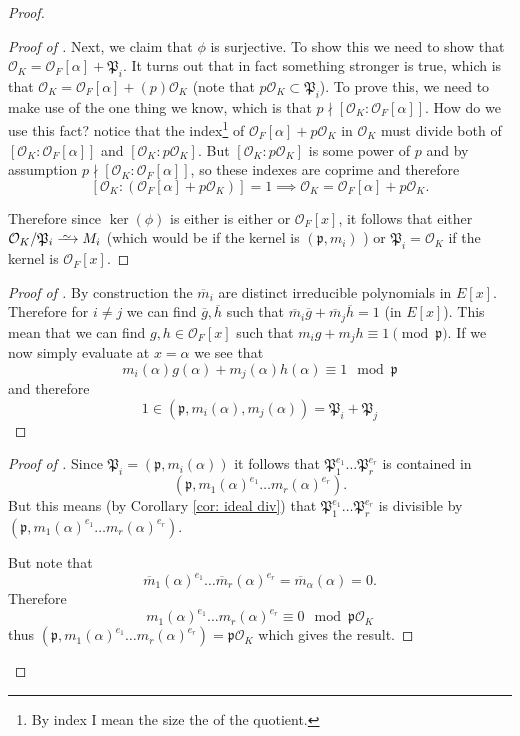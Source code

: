 \documentclass[11pt,a4paper]{report}
\theoremstyle{plain}
\theoremstyle{definition}
\theoremstyle{definition}
\def \gothP{\mathfrak{P}}
\def\gothp{\mathfrak{p}}
\def \a{\alpha}
\def \OO {\mathcal{O}}
\def \ov{\overline}
\newcommand\isorightarrow{\xrightarrow{
		\,\smash{\raisebox{-0.65ex}{\ensuremath{\scriptstyle\sim}}}\,}}
\begin{document}
\begin{proof}
\begin{proof}[Proof of \faGamepad]
			Next, we claim that $\phi$ is surjective. To show this we need to show that $\OO_K=\OO_F[\a]+\gothP_i$. It turns out that in fact something stronger is true, which is that $\OO_K=\OO_F[\a]+(p)\OO_K$ (note that $p\OO_K \subset \gothP_i$). To prove this, we need to make use of the one thing we know, which is that $p \nmid [\OO_K:\OO_F[\a]]$. How do we use this fact?  notice that the index\footnote{By index I mean the size the of the quotient.} of $\OO_F[\a]+p\OO_K$ in $\OO_K$ must divide both of $[\OO_K:\OO_F[\a]]$ and $[\OO_K:p\OO_K]$. But $[\OO_K:p\OO_K]$ is some power of $p$ and by assumption $p \nmid [\OO_K:\OO_F[\a]]$, so these indexes are coprime and therefore \[[\OO_K: (\OO_F[\a]+p\OO_K)]=1 \implies \OO_K=\OO_F[\a]+p\OO_K.\]
			
			Therefore since $\ker(\phi)$ is either is either  or $\OO_F[x]$, it follows that either  $\OO_K/\gothP_i \isorightarrow M_i$ (which would be if the kernel is $(\gothp,m_i)$ ) or $\gothP_i=\OO_K$ if the kernel is $\OO_F[x]$.
			
			
		\end{proof}
		
		
		\begin{proof}[Proof of \faRocket]
			By construction the $\ov{m}_i$ are distinct irreducible polynomials in $E[x]$. Therefore for $i \neq j$ we can find $\ov{g},\ov{h}$ such that $\ov{m}_i\ov{g}+\ov{m}_j\ov{h}=1$ (in $E[x]$). This mean that we can find $g,h \in \OO_F[x]$ such that $m_ig+m_jh \equiv 1 \pmod \gothp$. If we now simply evaluate at $x=\a$ we see that \[m_i(\a)g(\a)+m_j(\a)h(\a) \equiv 1 \mod \gothp\] and therefore \[1 \in (\gothp,m_i(\a),m_j(\a))=\gothP_i+\gothP_j\]
			
		\end{proof}
		
		\begin{proof}[Proof of \faMotorcycle]
			Since $\gothP_i=(\gothp,m_i(\a))$ it follows that $\gothP_1^{e_1}\dots\gothP_r^{e_r}$ is contained in \[(\gothp,m_1(\a)^{e_1}\dots m_r(\a)^{e_r}).\] But this means (by Corollary \ref{cor: ideal div}) that $\gothP_1^{e_1}\dots\gothP_r^{e_r}$ is divisible by $(\gothp,m_1(\a)^{e_1}\dots m_r(\a)^{e_r})$.
			
			But note that \[\ov{m}_1(\a)^{e_1}\dots \ov{m}_r(\a)^{e_r}=\ov{m}_\a(\a)=0.\] Therefore \[m_1(\a)^{e_1}\dots m_r(\a)^{e_r} \equiv 0 \mod \gothp\OO_K\] thus $(\gothp,m_1(\a)^{e_1}\dots m_r(\a)^{e_r})=\gothp\OO_K$ which gives the result.
			
		\end{proof}
		
		
	\end{proof}
	
\end{document}
